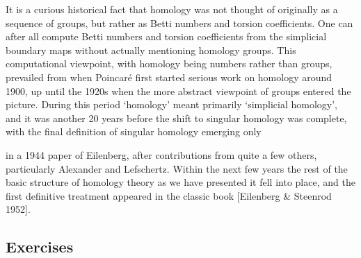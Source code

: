 It is a curious historical fact that homology was not thought of originally as a
sequence of groups, but rather as Betti numbers and torsion coefficients. One can
after all compute Betti numbers and torsion coefficients from the simplicial boundary
maps without actually mentioning homology groups. This computational viewpoint,
with homology being numbers rather than groups, prevailed from when Poincar\'e first
started serious work on homology around 1900, up until the 1920s when the more
abstract viewpoint of groups entered the picture. During this period `homology' meant
primarily `simplicial homology', and it was another 20 years before the shift to singular
homology was complete, with the final definition of singular homology emerging only

in a 1944 paper of Eilenberg, after contributions from quite a few others, particularly
Alexander and Lefschertz. Within the next few years the rest of the basic structure
of homology theory as we have presented it fell into place, and the first definitive
treatment appeared in the classic book [Eilenberg \& Steenrod 1952].

\subsection*{Exercises}

